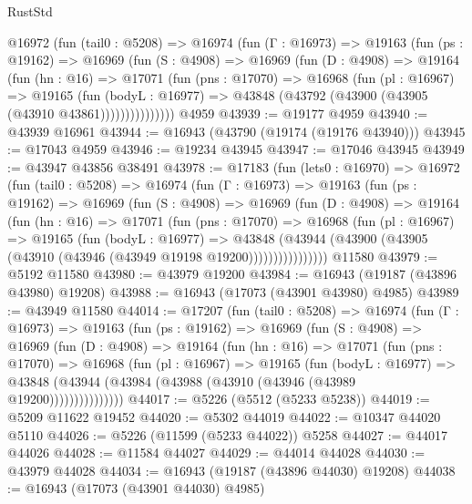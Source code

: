 \begin{lexlean}{RustStd}
\begin{coremodule}
      @16972
        (fun (tail0 : @5208) =>
        @16974
          (fun (Γ : @16973) =>
          @19163
            (fun (ps : @19162) =>
            @16969
              (fun (S : @4908) =>
              @16969
                (fun (D : @4908) =>
                @19164
                  (fun (hn : @16) =>
                  @17071
                    (fun (pns : @17070) =>
                    @16968
                      (fun (pl : @16967) =>
                      @19165
                        (fun (bodyL : @16977) =>
                        @43848 (@43792 (@43900 (@43905 (@43910 @43861)))))))))))))))
    @4959
@43939 := @19177 @4959
@43940 := @43939 @16961
@43944 := @16943 (@43790 (@19174 (@19176 @43940)))
@43945 := @17043 @4959
@43946 := @19234 @43945
@43947 := @17046 @43945
@43949 := @43947 @43856 @38491
@43978 := @17183
    (fun (lets0 : @16970) =>
    @16972
      (fun (tail0 : @5208) =>
      @16974
        (fun (Γ : @16973) =>
        @19163
          (fun (ps : @19162) =>
          @16969
            (fun (S : @4908) =>
            @16969
              (fun (D : @4908) =>
              @19164
                (fun (hn : @16) =>
                @17071
                  (fun (pns : @17070) =>
                  @16968
                    (fun (pl : @16967) =>
                    @19165
                      (fun (bodyL : @16977) =>
                      @43848
                        (@43944
                          (@43900 (@43905 (@43910 (@43946 (@43949 @19198 @19200))))))))))))))))
    @11580
@43979 := @5192 @11580
@43980 := @43979 @19200
@43984 := @16943 (@19187 (@43896 @43980) @19208)
@43988 := @16943 (@17073 (@43901 @43980) @4985)
@43989 := @43949 @11580
@44014 := @17207
    (fun (tail0 : @5208) =>
    @16974
      (fun (Γ : @16973) =>
      @19163
        (fun (ps : @19162) =>
        @16969
          (fun (S : @4908) =>
          @16969
            (fun (D : @4908) =>
            @19164
              (fun (hn : @16) =>
              @17071
                (fun (pns : @17070) =>
                @16968
                  (fun (pl : @16967) =>
                  @19165
                    (fun (bodyL : @16977) =>
                    @43848 (@43944 (@43984 (@43988 (@43910 (@43946 (@43989 @19200)))))))))))))))
@44017 := @5226 (@5512 (@5233 @5238))
@44019 := @5209 @11622 @19452
@44020 := @5302 @44019
@44022 := @10347 @44020 @5110
@44026 := @5226 (@11599 (@5233 @44022)) @5258
@44027 := @44017 @44026
@44028 := @11584 @44027
@44029 := @44014 @44028
@44030 := @43979 @44028
@44034 := @16943 (@19187 (@43896 @44030) @19208)
@44038 := @16943 (@17073 (@43901 @44030) @4985)

\end{coremodule}
\end{lexlean}
